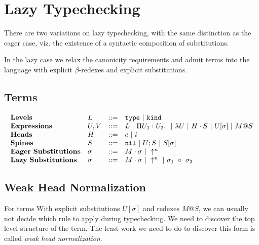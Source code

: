 
\section{Lazy Typechecking}

There are two variations on lazy typechecking, with the
same distinction as the eager case, viz. the existence
of a syntactic composition of substitutions.

In the lazy case we relax the canonicity requirements and 
admit terms into the language with explicit $\beta$-redexes
and explicit substitutions.


\subsection{Terms}

$$
\begin{array}{llll}
\mathbf{Levels} & L & ::= & \mathtt{type} \ |\  \mathtt{kind} \\
\mathbf{Expressions} & U,V & ::= & L \ |\  \Pi U_1 : U_2.\ \ |\  \lambda U \ |\  H\cdot S \ |\  U[\sigma] \ |\  M @ S\\
\mathbf{Heads} & H & ::= & c \ |\  i\\
\mathbf{Spines} & S & ::= & \mathtt{nil} \ |\  U;S \ |\  S[\sigma]\\
\mathbf{Eager\ Substitutions} & \sigma & ::= & M\cdot\sigma \ |\  \uparrow^n \\
\mathbf{Lazy\ Substitutions} & \sigma & ::= & M\cdot\sigma \ |\  \uparrow^n \ |\  \sigma_1 ~\circ~ \sigma_2\\
\end{array} 
$$


\subsection{Weak Head Normalization}

For terms With explicit substitutions $U[\sigma]$ and redexes $M @ S$,
we can usually not decide which rule to apply during typechecking.
We need to discover the top level structure of the term.  
The least work we need to do to discover this form is called 
\emph{weak head normalization}.  


